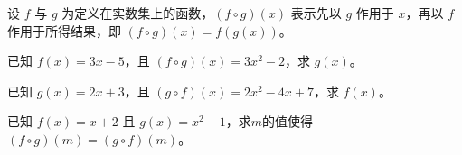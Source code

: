 \documentclass[12pt,a4paper]{exam-zh}
\newcommand{\qscore}[1]{%
    \unskip\nobreak\hfill
    \makebox[0pt][l]{\makebox[4em][r]{(#1\%)}}%
}
\begin{document}
\begin{question}[points = 15]
    设 $f$ 与 $g$ 为定义在实数集上的函数，$(f \circ g)(x)$ 表示先以 $g$ 作用于 $x$，再以 $f$ 作用于所得结果，即 $(f \circ g)(x) = f(g(x))$。

    \begin{questionparts}
        \item 已知 $f(x) = 3x - 5$，且 $(f \circ g)(x) = 3x^2 - 2$，求 $g(x)$。 \qscore{4}

        \item 已知 $g(x) = 2x + 3$，且 $(g \circ f)(x) = 2x^2 - 4x + 7$，求 $f(x)$。 \qscore{5}

        \item 已知 $f(x) = x + 2$ 且 $g(x) = x^2 - 1$，求$m$的值使得 $(f \circ g)(m) = (g \circ f)(m)$。 \qscore{5}
    \end{questionparts}
\end{question}
\end{document}
